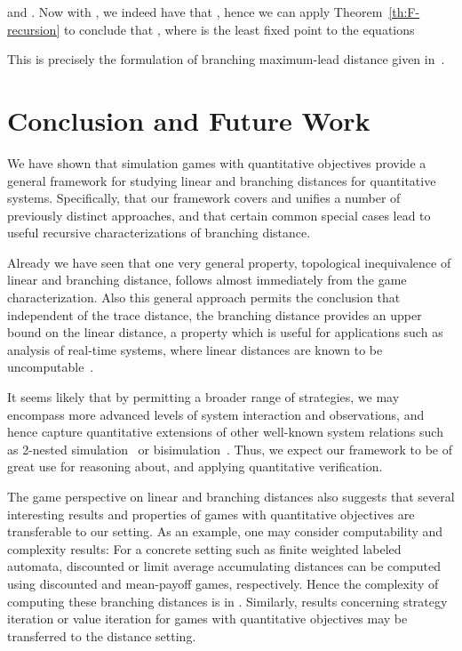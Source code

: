 \documentclass[copyright,creativecommons,sharealike]{eptcs}
\theoremstyle{plain}
\begin{document}
and . Now with , we indeed have that , hence we can
apply Theorem~\ref{th:F-recursion} to conclude that , where  is the least fixed point to the equations

This is precisely the formulation of branching maximum-lead distance
given in~\cite{conf/formats/2005/HenzM05}.

\section{Conclusion and Future Work}

We have shown that simulation games with quantitative objectives
provide a general framework for studying linear and branching
distances for quantitative systems.  Specifically, that our framework covers and unifies a number of
previously distinct approaches, and that certain common special cases
lead to useful recursive characterizations of branching distance.

Already we have seen that one very general property, topological
inequivalence of linear and branching distance, follows almost
immediately from the game characterization. Also this general approach
permits the conclusion that independent of the trace distance, the
branching distance provides an upper bound on the linear distance, a
property which is useful for applications such as analysis of
real-time systems, where linear distances are known to be
uncomputable~\cite{journals/jlap/ThraneFL10}.

It seems likely that by permitting a broader range of strategies, we
may encompass more advanced levels of system interaction and
observations, and hence capture quantitative extensions of other
well-known system relations such as 2-nested
simulation~\cite{DBLP:journals/iandc/GrooteV92,DBLP:conf/stacs/AcetoFI01}
or bisimulation~\cite{milner89}.  Thus, we expect our framework to be
of great use for reasoning about, and applying quantitative
verification.

The game perspective on linear and branching distances also suggests
that several interesting results and properties of games with
quantitative objectives are transferable to our setting.  As an
example, one may consider computability and complexity results: For a
concrete setting such as finite weighted labeled automata, discounted
or limit average accumulating distances can be computed using
discounted and mean-payoff games, respectively.  Hence the complexity
of computing these branching distances is in
.
Similarly, results concerning strategy iteration or value iteration
for games with quantitative objectives may be transferred to the
distance setting.



\end{document}
